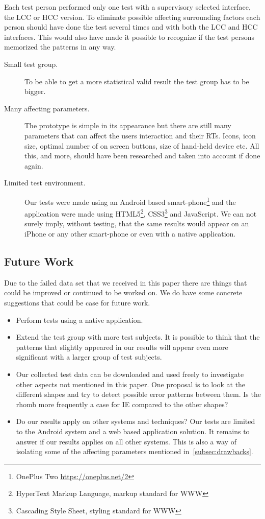 \documentclass[runningheads,a4paper]{llncs}
\begin{document}
Each test person performed only one test with a supervisory selected interface, the LCC or HCC version. To eliminate possible affecting surrounding factors each person should have done the test several times and with both the LCC and HCC interfaces. This would also have made it possible to recognize if the test persons memorized the patterns in any way.

\begin{description}
	\item[Small test group.] To be able to get a more statistical valid result the test group has to be bigger.
	\item[Many affecting parameters.] The prototype is simple in its appearance but there are still many parameters that can affect the users interaction and their RTs. Icons, icon size, optimal number of on screen buttons, size of hand-held device etc. All this, and more, should have been researched and taken into account if done again. 
	\item[Limited test environment.] Our tests were made using an Android based smart-phone\footnote{OnePlus Two \url{https://oneplus.net/2}} and the application were made using HTML5\footnote{HyperText Markup Language, markup standard for WWW}, CSS3\footnote{Cascading Style Sheet, styling standard for WWW} and JavaScript. We can not surely imply, without testing, that the same results would appear on an iPhone or any other smart-phone or even with a native application.
\end{description}

\subsection{Future Work}
Due to the failed data set that we received in this paper there are things that could be improved or continued to be worked on. 
We do have some concrete suggestions that could be case for future work. 

\begin{itemize}
	\item Perform tests using a native application.
	\item Extend the test group with more test subjects. It is possible to think that the patterns that slightly appeared in our results will appear even more significant with a larger group of test subjects.
	\item Our collected test data can be downloaded and used freely to investigate other aspects not mentioned in this paper. One proposal is to look at the different shapes and try to detect possible error patterns between them. Is the rhomb more frequently a case for IE compared to the other shapes?
	\item Do our results apply on other systems and techniques? Our tests are limited to the Android system and a web based application solution. It remains to answer if our results applies on all other systems. This is also a way of isolating some of the affecting parameters mentioned in~\ref{subsec:drawbacks}.
\end{itemize}
\end{document}
